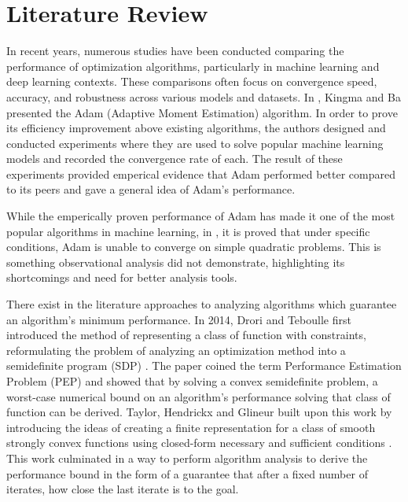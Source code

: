 \chapter{Literature Review}\label{chapter:literature}

In recent years, numerous studies have been conducted comparing the performance of optimization algorithms, particularly in machine learning and deep learning contexts. These comparisons often focus on convergence speed, accuracy, and robustness across various models and datasets. In \cite{adam}, Kingma and Ba presented the Adam (Adaptive Moment Estimation) algorithm. In order to prove its efficiency improvement above existing algorithms, the authors designed and conducted experiments where they are used to solve popular machine learning models and recorded the convergence rate of each. The result of these experiments provided emperical evidence that Adam performed better compared to its peers and gave a general idea of Adam's performance.

While the emperically proven performance of Adam has made it one of the most popular algorithms in machine learning, in \cite{adam2}, it is proved that under specific conditions, Adam is unable to converge on simple quadratic problems. This is something observational analysis did not demonstrate, highlighting its shortcomings and need for better analysis tools.

There exist in the literature approaches to analyzing algorithms which guarantee an algorithm's minimum performance. In 2014, Drori and Teboulle first introduced the method of representing a class of function with constraints, reformulating the problem of analyzing an optimization method into a semidefinite program (SDP) \cite{drori2012}. The paper coined the term Performance Estimation Problem (PEP) and showed that by solving a convex semidefinite problem, a worst-case numerical bound on an algorithm's performance solving that class of function can be derived. Taylor, Hendrickx and Glineur built upon this work by introducing the ideas of creating a finite representation for a class of smooth strongly convex functions using closed-form necessary and sufficient conditions \cite{pepit}. This work culminated in a way to perform algorithm analysis to derive the performance bound in the form of a guarantee that after a fixed number of iterates, how close the last iterate is to the goal.

